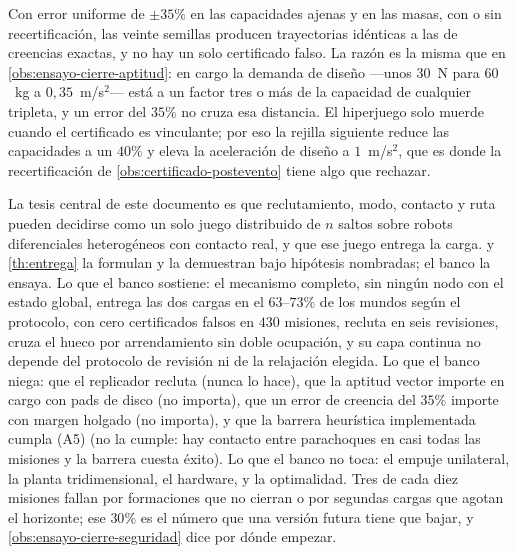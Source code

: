 \begin{observacion}
\label{obs:ensayo-cierre-hiperjuego}
Con error uniforme de $\pm35\%$ en las capacidades ajenas y en las masas, con
o sin recertificación, las veinte semillas producen trayectorias idénticas a
las de creencias exactas, y no hay un solo certificado falso. La razón es la
misma que en \cref{obs:ensayo-cierre-aptitud}: en \textsf{cargo} la demanda
de diseño —unos $30$~N para $60$~kg a $0{,}35$~m/s$^2$— está a un factor
tres o más de la capacidad de cualquier tripleta, y un error del $35\%$ no
cruza esa distancia. El hiperjuego solo muerde cuando el certificado es
vinculante; por eso la rejilla siguiente reduce las capacidades a un $40\%$ y
eleva la aceleración de diseño a $1$~m/s$^2$, que es donde la recertificación
de \cref{obs:certificado-postevento} tiene algo que rechazar.
\end{observacion}

\begin{observacion}
\label{obs:ensayo-cierre-balance}
La tesis central de este documento es que reclutamiento, modo, contacto y ruta
pueden decidirse como un solo juego distribuido de $n$ saltos sobre robots
diferenciales heterogéneos con contacto real, y que ese juego entrega la
carga.  y \cref{th:entrega} la formulan y la
demuestran bajo hipótesis nombradas; el banco la ensaya. Lo que el banco
sostiene: el mecanismo completo, sin ningún nodo con el estado global, entrega
las dos cargas en el $63$--$73\%$ de los mundos según el protocolo, con cero
certificados falsos en $430$ misiones, recluta en seis revisiones, cruza el
hueco por arrendamiento sin doble ocupación, y su capa continua no depende del
protocolo de revisión ni de la relajación elegida. Lo que el banco niega: que
el replicador recluta (nunca lo hace), que la aptitud vector importe en
\textsf{cargo} con pads de disco (no importa), que un error de creencia del
$35\%$ importe con margen holgado (no importa), y que la barrera heurística
implementada cumpla (A5) (no la cumple: hay contacto entre parachoques en
casi todas las misiones y la barrera cuesta éxito). Lo que el banco no toca:
el empuje unilateral, la planta tridimensional, el hardware, y la optimalidad.
Tres de cada diez misiones fallan por formaciones que no cierran o por
segundas cargas que agotan el horizonte; ese $30\%$ es el número que una
versión futura tiene que bajar, y \cref{obs:ensayo-cierre-seguridad} dice
por dónde empezar.
\end{observacion}


